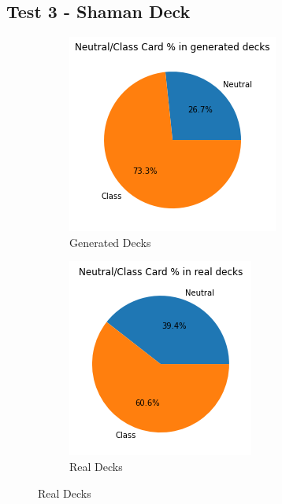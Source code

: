 \documentclass{report} %
\begin{document}
\subsection{Test 3 - Shaman Deck}
\begin{figure}[H]
\centering
\begin{subfigure}{.3\textwidth}
  \centering
  \includegraphics[width=.75\linewidth]{TestImages/NeutralSplitShamanDecksFake}
  \caption{Generated Decks}
\end{subfigure}%
\begin{subfigure}{.3\textwidth}
  \centering
  \includegraphics[width=.75\linewidth]{TestImages/NeutralSplitShamanDecksReal}
  \caption{Real Decks}
\end{subfigure}%

\end{figure}
\end{document}
